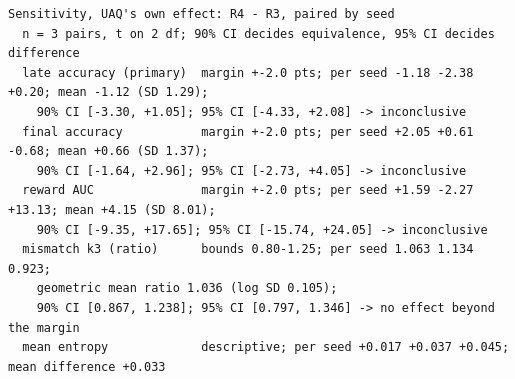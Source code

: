 {\begin{verbatim}
Sensitivity, UAQ's own effect: R4 - R3, paired by seed
  n = 3 pairs, t on 2 df; 90% CI decides equivalence, 95% CI decides difference
  late accuracy (primary)  margin +-2.0 pts; per seed -1.18 -2.38 +0.20; mean -1.12 (SD 1.29);
    90% CI [-3.30, +1.05]; 95% CI [-4.33, +2.08] -> inconclusive
  final accuracy           margin +-2.0 pts; per seed +2.05 +0.61 -0.68; mean +0.66 (SD 1.37);
    90% CI [-1.64, +2.96]; 95% CI [-2.73, +4.05] -> inconclusive
  reward AUC               margin +-2.0 pts; per seed +1.59 -2.27 +13.13; mean +4.15 (SD 8.01);
    90% CI [-9.35, +17.65]; 95% CI [-15.74, +24.05] -> inconclusive
  mismatch k3 (ratio)      bounds 0.80-1.25; per seed 1.063 1.134 0.923;
    geometric mean ratio 1.036 (log SD 0.105);
    90% CI [0.867, 1.238]; 95% CI [0.797, 1.346] -> no effect beyond the margin
  mean entropy             descriptive; per seed +0.017 +0.037 +0.045; mean difference +0.033
\end{verbatim}}

